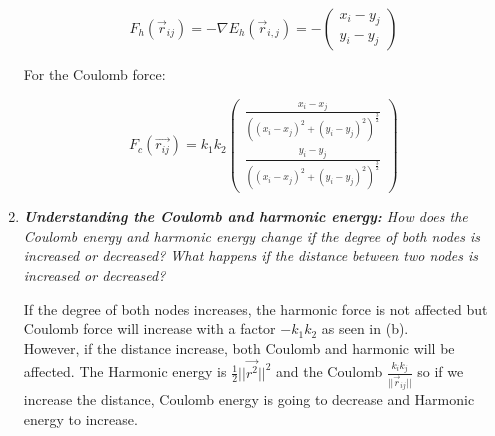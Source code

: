 \documentclass[10pt,a4paper]{article}
\newcommand{\norm}[1]{\left\lVert#1\right\rVert}
\begin{document}
\begin{enumerate}
	
	
	


	
	\[ F_{h}(\vec{r}_{ij}) = -\nabla E_{h}(\vec{r}_{i,j})  = -\begin{pmatrix}
	x_i - y_j\\
	y_i - y_j
	\end{pmatrix} \]

	
	For the Coulomb force:
	
	\[F_{c}(\vec{r_{ij}}) = k_1 k_2 \begin{pmatrix}
	\frac{x_i - x_j}{\left( (x_i - x_j)^2 + (y_i - y_j)^2 \right)^{\frac{3}{2}}}\\
	\frac{y_i - y_j}{\left( (x_i - x_j)^2 + (y_i - y_j)^2 \right)^{\frac{3}{2}}}
	\end{pmatrix} \]

	\item \textit{\textbf{Understanding the Coulomb and harmonic energy:} How does the Coulomb energy and harmonic energy change if the degree of both nodes is increased or decreased? What happens if the distance between two nodes is increased or decreased?}
	
			
		If the degree of both nodes increases, the harmonic force is not affected but Coulomb force will increase with a factor $ -k_1 k_2 $ as seen in (b). \\
		
		However, if the distance increase, both Coulomb and harmonic will be affected. The Harmonic energy is  $\frac{1}{2}||\vec{r^2}||^2$ and the Coulomb $ \frac{k_i k_j}{||\vec{r}_{ij}||} $ so if we increase the distance, Coulomb energy is going to decrease and Harmonic energy to increase. 
	

\end{enumerate}
\end{document}
